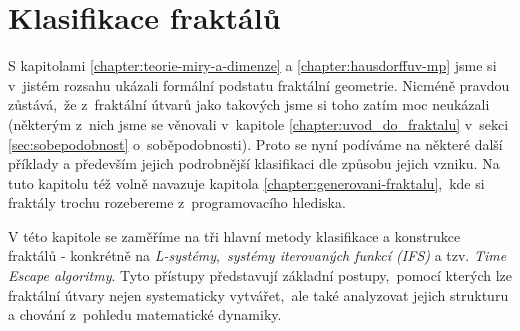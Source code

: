 \chapter{Klasifikace fraktálů}\label{chapter:klasifikace-fraktalu}

S kapitolami \ref{chapter:teorie-miry-a-dimenze} a \ref{chapter:hausdorffuv-mp} jsme si v~jistém rozsahu ukázali formální podstatu fraktální geometrie. Nicméně pravdou zůstává,~že z~fraktální útvarů jako takových jsme si toho zatím moc neukázali (některým z~nich jsme se věnovali v~kapitole \ref{chapter:uvod_do_fraktalu} v~sekci \ref{sec:sobepodobnost} o~soběpodobnosti). Proto se nyní podíváme na některé další příklady a především jejich podrobnější klasifikaci dle způsobu jejich vzniku. Na tuto kapitolu též volně navazuje kapitola \ref{chapter:generovani-fraktalu},~kde si fraktály trochu rozebereme z~programovacího hlediska.

V této kapitole se zaměříme na tři hlavní metody klasifikace a konstrukce fraktálů - konkrétně na \emph{L-systémy},~\emph{systémy iterovaných funkcí (IFS)} a tzv. \emph{Time Escape algoritmy}. Tyto přístupy představují základní postupy,~pomocí kterých lze fraktální útvary nejen systematicky vytvářet,~ale také analyzovat jejich strukturu a chování z~pohledu matematické dynamiky.



